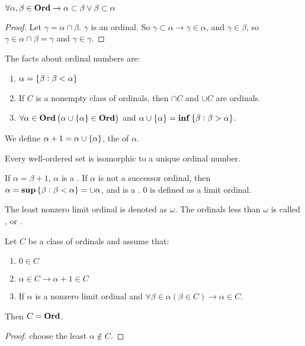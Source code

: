 \begin{theorem} 
    $\forall \alpha, \beta \in \mathbf{Ord} \rightarrow \alpha \subset \beta \vee \beta \subset \alpha$
\end{theorem}
\begin{proof}
    Let $\gamma = \alpha \cap \beta$. $\gamma$ is an ordinal. So $\gamma \subset \alpha \rightarrow \gamma \in \alpha$, and $\gamma \in \beta$, so $\gamma \in \alpha \cap \beta = \gamma$ and $\gamma \in \gamma$.
\end{proof}

\begin{theorem}
    The facts about ordinal numbers are:
    \begin{enumerate}
        \item $\alpha = \set{\beta: \beta < \alpha}$
        \item If $C$ is a nonempty class of ordinals, then $\cap C$ and $\cup C$ are ordinals.
        \item $\forall \alpha \in \mathbf{Ord} \left(\alpha \cup \set{\alpha} \in \mathbf{Ord} \right)$ and $\alpha \cup \set{\alpha} = \mathbf{inf} \set{\beta: \beta > \alpha}$.
    \end{enumerate}    
\end{theorem}

\begin{definition}
    We define $\alpha + 1 = \alpha \cup \set{\alpha}$, the  of $\alpha$.
\end{definition}

\begin{theorem}
    Every well-ordered set is isomorphic to a unique ordinal number.    
\end{theorem}

\begin{definition}
    If $\alpha = \beta + 1$, $\alpha$ is a . If $\alpha$ is not a successor ordinal, then $\alpha = \mathbf{sup} \set{\beta: \beta < \alpha} = \cup \alpha$, and is a . $0$ is defined as a limit ordinal.
\end{definition}

\begin{definition}
    The least nonzero limit ordinal is denoted as $\omega$. The ordinals less than $\omega$ is called , or .
\end{definition}

\begin{theorem}
    Let $C$ be a class of ordinals and assume that:
    \begin{enumerate}
        \item $0 \in C$
        \item $\alpha \in C \rightarrow \alpha + 1 \in C$
        \item If $\alpha$ is a nonzero limit ordinal and $\forall \beta \in \alpha (\beta \in C) \rightarrow \alpha \in C$.
    \end{enumerate}
    Then $C = \mathbf{Ord}$.
\end{theorem}
\begin{proof}
    choose the least $\alpha \notin C$.
\end{proof}

